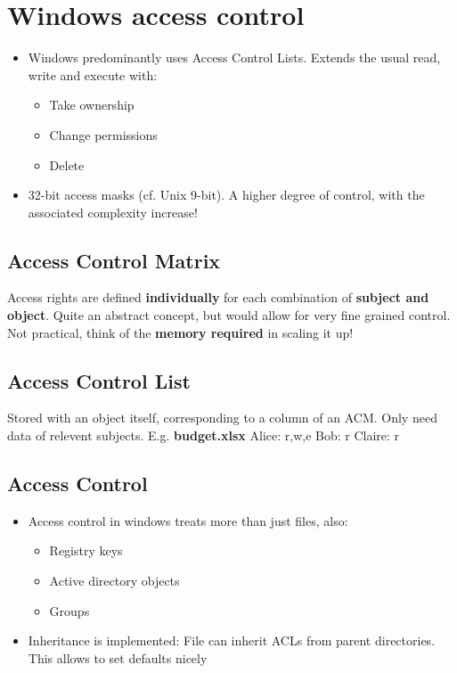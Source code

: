 \documentclass{article}
\begin{document}
\tableofcontents

\newpage

\section{Windows access control}
\begin{itemize}
  \item Windows predominantly uses Access Control Lists. Extends the usual read, write and execute with: 
  \begin{itemize}
    \item Take ownership 
    \item Change permissions 
    \item Delete 
  \end{itemize}
  \item 32-bit access masks (cf. Unix 9-bit). A higher degree of control, with the associated complexity increase!
\end{itemize}

\subsection{Access Control Matrix}
\begin{flushleft}
Access rights are defined \textbf{individually} for each combination of \textbf{subject and object}. Quite an abstract concept, but would allow for very fine grained control. Not practical, think of the \textbf{memory required} in scaling it up!
\end{flushleft}

\subsection{Access Control List}
\begin{flushleft}
Stored with an object itself, corresponding to a column of an ACM. Only need data of relevent subjects. E.g. \textbf{budget.xlsx} Alice: r,w,e Bob: r Claire: r
\end{flushleft}

\subsection{Access Control}
\begin{itemize}
  \item Access control in windows treats more than just files, also:
  \begin{itemize}
    \item Registry keys 
    \item Active directory objects 
    \item Groups
  \end{itemize}
  \item Inheritance is implemented: File can inherit ACLs from parent directories. This allows to set defaults nicely
\end{itemize}
\end{document}
